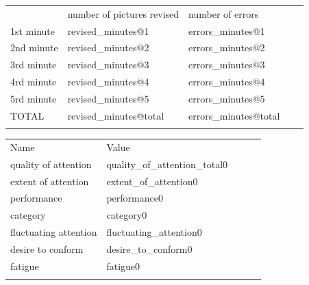 \documentclass[letterpaper, 11pt]{article}
\numberwithin{equation}{section}
\begin{document}
\thispagestyle{firststyle}
\insertidentifiers


\begin{tabular}{lllll}
\cline{1-3}
\multicolumn{1}{|l|}{} & \multicolumn{1}{l|}{number of pictures revised} & \multicolumn{1}{l|}{number of errors} &  &  \\ \cline{1-3}
\multicolumn{1}{|l|}{1st minute} & \multicolumn{1}{l|}{revised_minutes@1} & \multicolumn{1}{l|}{errors_minutes@1} &  &  \\ \cline{1-3}
\multicolumn{1}{|l|}{2nd minute} & \multicolumn{1}{l|}{revised_minutes@2} & \multicolumn{1}{l|}{errors_minutes@2} &  &  \\ \cline{1-3}
\multicolumn{1}{|l|}{3rd minute} & \multicolumn{1}{l|}{revised_minutes@3} & \multicolumn{1}{l|}{errors_minutes@3} &  &  \\ \cline{1-3}
\multicolumn{1}{|l|}{4rd minute} & \multicolumn{1}{l|}{revised_minutes@4} & \multicolumn{1}{l|}{errors_minutes@4} &  &  \\ \cline{1-3}
\multicolumn{1}{|l|}{5rd minute} & \multicolumn{1}{l|}{revised_minutes@5} & \multicolumn{1}{l|}{errors_minutes@5} &  &  \\ \cline{1-3}
\multicolumn{1}{|l|}{TOTAL} & \multicolumn{1}{l|}{revised_minutes@total} & \multicolumn{1}{l|}{errors_minutes@total} &  &  \\ \cline{1-3}
                       &                       &                       &  & 
\end{tabular}



\begin{tabular}{lllll}
\cline{1-2}
\multicolumn{1}{|l|}{Name} & \multicolumn{1}{l|}{Value} &  &  \\ \cline{1-2}
\multicolumn{1}{|l|}{quality of attention}  & \multicolumn{1}{l|}{quality_of_attention_total0} &  &  \\ \cline{1-2}
\multicolumn{1}{|l|}{extent of attention}  & \multicolumn{1}{l|}{extent_of_attention0} &  &  \\ \cline{1-2}
\multicolumn{1}{|l|}{performance}  & \multicolumn{1}{l|}{performance0} &  &  \\ \cline{1-2}
\multicolumn{1}{|l|}{category}  & \multicolumn{1}{l|}{ category0} &  &  \\ \cline{1-2}
\multicolumn{1}{|l|}{fluctuating attention}  & \multicolumn{1}{l|}{ fluctuating_attention0} &  &  \\ \cline{1-2}
\multicolumn{1}{|l|}{desire to conform}  & \multicolumn{1}{l|}{desire_to_conform0} &  &  \\ \cline{1-2}
\multicolumn{1}{|l|}{fatigue}  & \multicolumn{1}{l|}{fatigue0} &  &  \\ \cline{1-2}

                       &                       &                       &  & 
\end{tabular}
\end{document}
